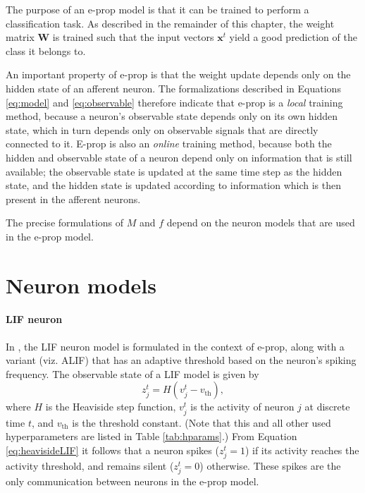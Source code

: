         The purpose of an e-prop model is that it can be trained to perform a classification task.
        As described in the remainder of this chapter, the weight matrix $\mathbf{W}$ is trained such that the input vectors $\mathbf{x}^t$ yield a good prediction of the class it belongs to.

        An important property of e-prop is that the weight update depends only on the hidden state of an afferent neuron.
        The formalizations described in Equations \ref{eq:model} and \ref{eq:observable} therefore indicate that e-prop is a \emph{local} training method, because a neuron's observable state depends only on its own hidden state, which in turn depends only on observable signals that are directly connected to it.
        E-prop is also an \emph{online} training method, because both the hidden and observable state of a neuron depend only on information that is still available; the observable state is updated at the same time step as the hidden state, and the hidden state is updated according to information which is then present in the afferent neurons.

        The precise formulations of $M$ and $f$ depend on the neuron models that are used in the e-prop model.

    \section{Neuron models}\label{sec:alif}

        \paragraph{LIF neuron}
            In \citet{bellec2020solution}, the LIF neuron model is formulated in the context of e-prop, along with a variant (viz. ALIF) that has an adaptive threshold based on the neuron's spiking frequency.
            The observable state of a LIF model is given by
            \begin{equation}\label{eq:heavisideLIF}
            z^t_j = H\left(v_j^t-v_\text{th}\right),
            \end{equation}
            where $H$ is the Heaviside step function, $v^t_j$ is the activity of neuron $j$ at discrete time $t$, and $v_\text{th}$ is the threshold constant.
            (Note that this and all other used hyperparameters are listed in Table \ref{tab:hparams}.)
            From Equation \ref{eq:heavisideLIF} it follows that a neuron spikes ($z^t_j = 1$) if its activity reaches the activity threshold, and remains silent ($z^t_j = 0$) otherwise.
            These spikes are the only communication between neurons in the e-prop model.

